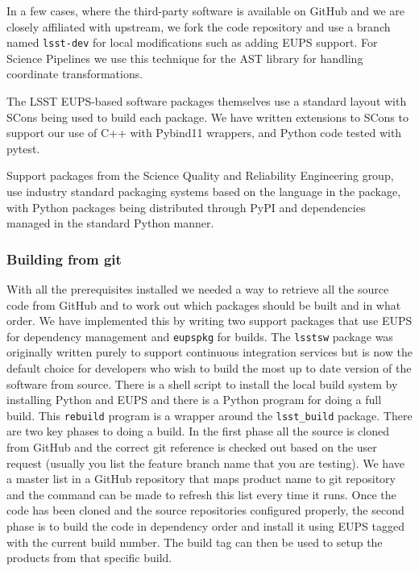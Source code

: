 In a few cases, where the third-party software is available on GitHub and we are closely affiliated with upstream, we fork the code repository and use a branch named \texttt{lsst-dev} for local modifications such as adding EUPS support.
For Science Pipelines we use this technique for the AST library\cite{2016A&C....15...33B} for handling coordinate transformations.

The LSST EUPS-based software packages themselves use a standard layout with SCons\cite{2005Scons1377085} being used to build each package.
We have written extensions to SCons to support our use of C++ with Pybind11 wrappers, and Python code tested with pytest.

Support packages from the Science Quality and Reliability Engineering group, use industry standard packaging systems based on the language in the package, with Python packages being distributed through PyPI and dependencies managed in the standard Python manner.

\subsubsection{Building from git}

With all the prerequisites installed we needed a way to retrieve all the source code from GitHub and to work out which packages should be built and in what order.
We have implemented this by writing two support packages that use EUPS for dependency management and \texttt{eupspkg} for builds.
The \texttt{lsstsw} package was originally written purely to support continuous integration services but is now the default choice for developers who wish to build the most up to date version of the software from source.
There is a shell script to install the local build system by installing Python and EUPS and there is a Python program for doing a full build.
This \texttt{rebuild} program is a wrapper around the \texttt{lsst\_build} package.
There are two key phases to doing a build.
In the first phase all the source is cloned from GitHub and the correct git reference is checked out based on the user request (usually you list the feature branch name that you are testing).
We have a master list in a GitHub repository that maps product name to git repository and the command can be made to refresh this list every time it runs.
Once the code has been cloned and the source repositories configured properly, the second phase is to build the code in dependency order and install it using EUPS tagged with the current build number.
The build tag can then be used to setup the products from that specific build.


